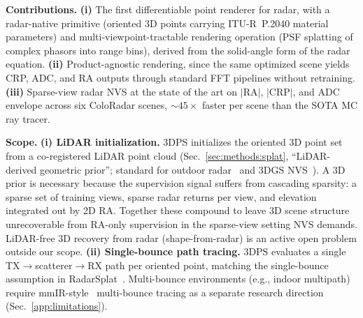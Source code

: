\textbf{Contributions.} \textbf{(i)} The first differentiable point renderer for radar, with a radar-native primitive (oriented 3D points carrying ITU-R~P.2040 material parameters) and multi-viewpoint-tractable rendering operation (PSF splatting of complex phasors into range bins), derived from the solid-angle form of the radar equation. \textbf{(ii)} Product-agnostic rendering, since the same optimized scene yields CRP, ADC, and RA outputs through standard FFT pipelines without retraining. \textbf{(iii)} Sparse-view radar NVS at the state of the art on $|\mathrm{RA}|$, $|\mathrm{CRP}|$, and ADC envelope across six ColoRadar scenes, ${\sim}45\times$ faster per scene than the SOTA MC ray tracer.

\textbf{Scope.} \textbf{(i) LiDAR initialization.} 3DPS initializes the oriented 3D point set from a co-registered LiDAR point cloud (Sec.~\ref{sec:methods:splat}, ``LiDAR-derived geometric prior''; standard for outdoor radar~\cite{kung2025radarsplat, mmIR2026, kramer2022coloradar} and 3DGS NVS~\cite{xiong2023sparsegs, yan2024streetgaussians}). A 3D prior is necessary because the supervision signal suffers from cascading sparsity: a sparse set of training views, sparse radar returns per view, and elevation integrated out by 2D RA. Together these compound to leave 3D scene structure unrecoverable from RA-only supervision in the sparse-view setting NVS demands. LiDAR-free 3D recovery from radar (shape-from-radar) is an active open problem outside our scope. \textbf{(ii) Single-bounce path tracing.} 3DPS evaluates a single TX$\to$scatterer$\to$RX path per oriented point, matching the single-bounce assumption in RadarSplat~\cite{kung2025radarsplat}. Multi-bounce environments (e.g., indoor multipath) require mmIR-style~\cite{mmIR2026} multi-bounce tracing as a separate research direction (Sec.~\ref{app:limitations}).
